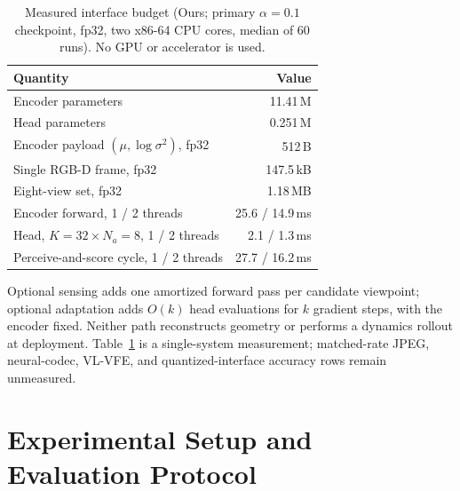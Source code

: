\documentclass[letterpaper, 10pt, conference]{ieeeconf}
\begin{document}
\begin{table}[t]
\centering
\caption{Measured interface budget (Ours; primary $\alpha{=}0.1$
checkpoint, fp32, two x86-64 CPU cores, median of 60 runs). No GPU or
accelerator is used.}
\label{tab:interface}
\begin{tabular}{lr}
\toprule
Quantity & Value \\
\midrule
Encoder parameters & 11.41\,M \\
Head parameters & 0.251\,M \\
Encoder payload $(\mu,\log\sigma^2)$, fp32 & 512\,B \\
Single RGB-D frame, fp32 & 147.5\,kB \\
Eight-view set, fp32 & 1.18\,MB \\
Encoder forward, 1 / 2 threads & 25.6 / 14.9\,ms \\
Head, $K{=}32\times N_a{=}8$, 1 / 2 threads & 2.1 / 1.3\,ms \\
Perceive-and-score cycle, 1 / 2 threads & 27.7 / 16.2\,ms \\
\bottomrule
\end{tabular}
\end{table}
Optional sensing adds one amortized forward pass per candidate viewpoint;
optional adaptation adds $O(k)$ head evaluations for $k$ gradient steps,
with the encoder fixed. Neither path reconstructs geometry or performs a
dynamics rollout at deployment. Table~\ref{tab:interface} is a single-system
measurement; matched-rate JPEG, neural-codec, VL-VFE, and quantized-interface
accuracy rows remain unmeasured.

\section{Experimental Setup and Evaluation Protocol}
\label{sec:setup}
\end{document}
